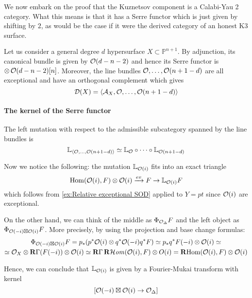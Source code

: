 We now embark on the proof that the Kuznetsov component is a Calabi-Yau 2 category. What this means is that it has a Serre functor which is just given by shifting by $2$, as would be the case if it were the derived category of an honest K3 surface.

    

Let us consider a general degree $d$ hypersurface $X \subset \mathbb{P}^{n+1}$. By adjunction, its canonical bundle is given by $\mathcal{O}(d-n-2)$ and hence its Serre functor is $\otimes \,\mathcal{O}(d-n-2)[n] $. Moreover, the line bundles $\mathcal{O},\dots,\mathcal{O}(n+1-d)$ are all exceptional and have an orthogonal complement which gives $$\mathcal{D}(X)=\langle \mathcal{A}_X,\mathcal{O},\dots,\mathcal{O}(n+1-d) \rangle $$

\paragraph*{The kernel of the Serre functor}

The left mutation with respect to the admissible subcategory spanned by the line bundles is $$\mathbb{L}_{\langle \mathcal{O}, \dots, \mathcal{O}(n+1-d) \rangle}\simeq \mathbb{L}_{\mathcal{O}} \circ \dots \circ \mathbb{L}_{\mathcal{O}(n+1-d)}$$

Now we notice the following: the mutation $\mathbb{L}_{\mathcal{O}(i)}$ fits into an exact triangle $$\operatorname{Hom}(\mathcal{O}(i), F)\otimes \mathcal{O}(i) \xrightarrow{ev} F \rightarrow \mathbb{L}_{\mathcal{O}(i)} F$$
which follows from \ref{ex:Relative exceptional SOD} applied to $Y=pt$ since $\mathcal{O}(i)$ are exceptional.


On the other hand, we can think of the middle as $\Phi_{\mathcal{O}_\Delta}F$ and the left object as $\Phi_{\mathcal{O}(-i)\boxtimes \mathcal{O}(i)}F$. More precisely, by using the projection and base change formulas:
\begin{gather*}
    \Phi_{\mathcal{O}(-i)\boxtimes \mathcal{O}(i)}F=p_* (p^*\mathcal{O}(i)\otimes q^* \mathcal{O}(-i)q^*F)\simeq p_* q^* F(-i)\otimes \mathcal{O}(i)\simeq\\
    \simeq \mathcal{O}_X \otimes \operatorname{\mathbf{R}\Gamma} (F(-i))\otimes \mathcal{O}(i)\simeq \operatorname{\mathbf{R}\Gamma} \operatorname{\mathbf{R}\mathcal{H}\mathit{om}}(\mathcal{O}(i),F) \otimes O(i)=\operatorname{\mathbf{R} Hom}(\mathcal{O}(i),F) \otimes \mathcal{O}(i)
\end{gather*}

Hence, we can conclude that $\mathbb{L}_{\mathcal{O}(i)}$ is given by a Fourier-Mukai transform with kernel $$[\mathcal{O}(-i)\boxtimes \mathcal{O}(i)\rightarrow \mathcal{O}_\Delta]$$

